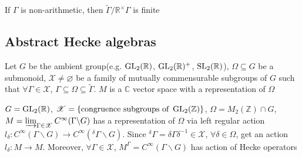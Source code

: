 \documentclass[main]{subfiles}
\begin{document}
\begin{remark}
If $\Gamma$ is non-arithmetic, then $\tilde\Gamma/\mathbb R^\times\Gamma$ is finite
\end{remark}

\subsection{Abstract Hecke algebras}

Let $G$ be the ambient group(e.g. $\operatorname{GL}_2(\mathbb R)$, $\operatorname{GL}_2(\mathbb R)^+$, $\operatorname{SL}_2(\mathbb R)$), $\Omega\subseteq G$ be a submonoid, $\mathscr X\neq\varnothing$ be a family of mutually commensurable subgroups of $G$ such that $\forall\Gamma\in\mathscr X$, $\Gamma\subseteq\Omega\subseteq\tilde\Gamma$. $M$ is a $\mathbb C$ vector space with a representation of $\Omega$

\begin{example}
$G=\operatorname{GL}_2(\mathbb R)$, $\mathscr X=\{\text{congruence subgroups of }\operatorname{GL}_2(\mathbb Z)\}$, $\Omega=M_2(\mathbb Z)\cap G$, $M=\varinjlim_{\Gamma\in\mathscr X}C^\infty(\Gamma\backslash G)$ has a representation of $\Omega$ via left regular action $l_\delta:C^\infty(\Gamma\backslash G)\to C^\infty(^\delta\Gamma\backslash G)$. Since $^\delta\Gamma=\delta\Gamma\delta^{-1}\in\mathscr X$, $\forall\delta\in\Omega$, get an action $l_\delta:M\to M$. Moreover, $\forall \Gamma\in\mathscr X$, $M^\Gamma=C^\infty(\Gamma\backslash G)$ has action of Hecke operators
\end{example}
\end{document}

